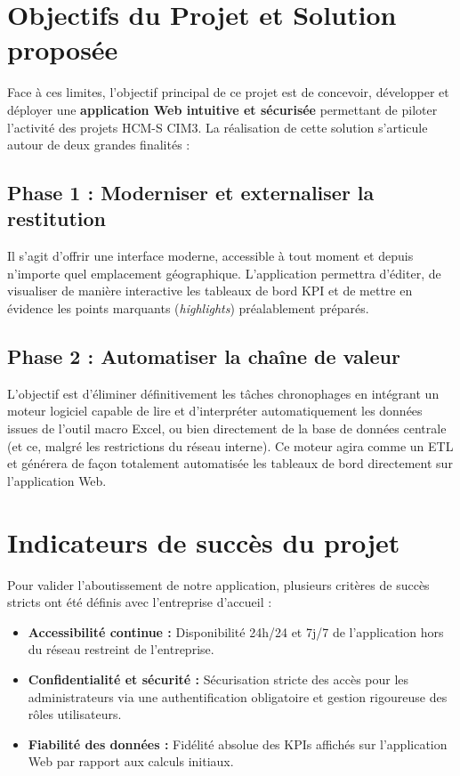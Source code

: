 \section{Objectifs du Projet et Solution proposée}
Face à ces limites, l'objectif principal de ce projet est de concevoir, développer et déployer une \textbf{application Web intuitive et sécurisée} permettant de piloter l'activité des projets HCM-S CIM3. La réalisation de cette solution s'articule autour de deux grandes finalités :

\subsection{Phase 1 : Moderniser et externaliser la restitution}
Il s'agit d'offrir une interface moderne, accessible à tout moment et depuis n'importe quel emplacement géographique. L'application permettra d'éditer, de visualiser de manière interactive les tableaux de bord KPI et de mettre en évidence les points marquants (\textit{highlights}) préalablement préparés.

\subsection{Phase 2 : Automatiser la chaîne de valeur}
L'objectif est d'éliminer définitivement les tâches chronophages en intégrant un moteur logiciel capable de lire et d'interpréter automatiquement les données issues de l'outil macro Excel, ou bien directement de la base de données centrale (et ce, malgré les restrictions du réseau interne). Ce moteur agira comme un ETL et générera de façon totalement automatisée les tableaux de bord directement sur l'application Web.

\section{Indicateurs de succès du projet}
Pour valider l'aboutissement de notre application, plusieurs critères de succès stricts ont été définis avec l'entreprise d'accueil :
\begin{itemize}
    \item \textbf{Accessibilité continue :} Disponibilité 24h/24 et 7j/7 de l'application hors du réseau restreint de l'entreprise.
    \item \textbf{Confidentialité et sécurité :} Sécurisation stricte des accès pour les administrateurs via une authentification obligatoire et gestion rigoureuse des rôles utilisateurs.
    \item \textbf{Fiabilité des données :} Fidélité absolue des KPIs affichés sur l'application Web par rapport aux calculs initiaux.
\end{itemize}


